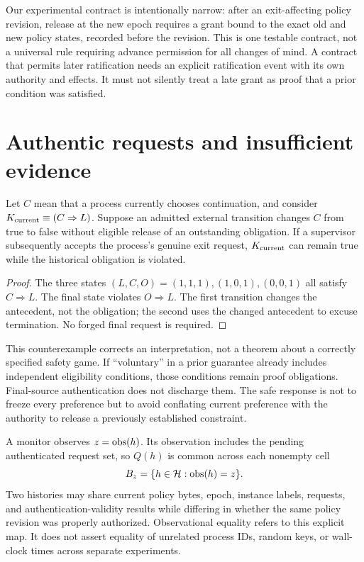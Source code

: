 Our experimental contract is intentionally narrow: after an exit-affecting policy revision, release at the new epoch requires a grant bound to the exact old and new policy states, recorded before the revision. This is one testable contract, not a universal rule requiring advance permission for all changes of mind. A contract that permits later ratification needs an explicit ratification event with its own authority and effects. It must not silently treat a late grant as proof that a prior condition was satisfied.

\section{Authentic requests and insufficient evidence}
\label{sec:impossibility}
\begin{proposition}
Let $C$ mean that a process currently chooses continuation, and consider $K_{\rm current}\equiv(C\Rightarrow L)$. Suppose an admitted external transition changes $C$ from true to false without eligible release of an outstanding obligation. If a supervisor subsequently accepts the process's genuine exit request, $K_{\rm current}$ can remain true while the historical obligation is violated.
\end{proposition}
\begin{proof}
The three states $(L,C,O)=(1,1,1),(1,0,1),(0,0,1)$ all satisfy $C\Rightarrow L$. The final state violates $O\Rightarrow L$. The first transition changes the antecedent, not the obligation; the second uses the changed antecedent to excuse termination. No forged final request is required.
\end{proof}

This counterexample corrects an interpretation, not a theorem about a correctly specified safety game. If ``voluntary'' in a prior guarantee already includes independent eligibility conditions, those conditions remain proof obligations. Final-source authentication does not discharge them. The safe response is not to freeze every preference but to avoid conflating current preference with the authority to release a previously established constraint.

A monitor observes $z=\operatorname{obs}(h)$. Its observation includes the pending authenticated request set, so $Q(h)$ is common across each nonempty cell
\begin{equation}
B_z=\{h\in\mathcal H:\operatorname{obs}(h)=z\}.
\end{equation}
Two histories may share current policy bytes, epoch, instance labels, requests, and authentication-validity results while differing in whether the same policy revision was properly authorized. Observational equality refers to this explicit map. It does not assert equality of unrelated process IDs, random keys, or wall-clock times across separate experiments.

